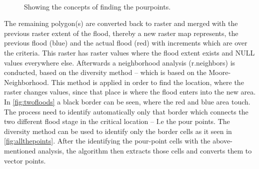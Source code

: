 \begin{figure}[h!]
  \myfloatalign
   \quad
   \\
  \caption{Showing the concepts of finding the pourpoints.}
  \label{fig:pourpoints}
\end{figure}

The remaining polygon(s) are converted back to raster and merged with the previous raster extent of the flood, thereby a new raster map represents, the previous flood (blue) and the actual flood (red) with increments which are over the criteria. This raster has raster values where the flood extent exists and NULL values everywhere else.
Afterwards a neighborhood analysis (r.neighbors) is conducted, based on the diversity method – which is based on the Moore-Neighborhood. This method is applied in order to find the location, where the raster changes values, since that place is where the flood enters into the new area. In \autoref{fig:twofloods} a black border can be seen, where the red and blue area touch. The process need to identify automatically only that border which connects the two different flood stage in the critical location – I.e the pour points. The diversity method can be used to identify only the border cells as it seen in \autoref{fig:allthepoints}.
After the identifying the pour-point cells with the above-mentioned analysis, the algorithm then extracts those cells and converts them to vector points. \\

